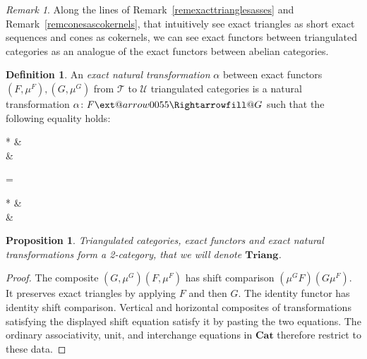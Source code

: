 \documentclass[11pt,reqno,a4paper]{amsart}
\makeatletter
\newtheorem{proposition}[theorem]{Proposition}
\theoremstyle{definition}
\newtheorem{definition}[theorem]{Definition}
\theoremstyle{remark}
\newtheorem{remark}[theorem]{Remark}
\def\nameit#1{\textrm{#1}~}
\def\remx{\nameit{Remark}}
\def\dfn#1{{\itshape #1}}
\newenvironment{eqD*}{\begin{equation*}}{\end{equation*}\ignorespacesafterend}
\newcommand{\T}{\mathcal{T}}
\newcommand{\U}{\mathcal{U}}
\newcommand{\0}{\mathbf{0}}
\renewcommand{\1}{\mathbf{1}}
\newcommand{\Cat}{\mathbf{Cat}}
\newcommand{\Triang}{\mathbf{Triang}}
\def\:{\colon}
\newcommand{\aR}[2][]{
	\ext@arrow 0055{\Rightarrowfill@}{#1}{#2}}
\makeatother
\begin{document}
\begin{remark}
    Along the lines of \remx\ref{remexacttrianglesasses} and \remx\ref{remconesascokernels}, that intuitively see exact triangles as short exact sequences and cones as cokernels, we can see exact functors between triangulated categories as an analogue of the exact functors between abelian categories.
\end{remark}

\begin{definition}
    An \dfn{exact natural transformation} $\alpha$ between exact functors $(F,\mu^F),(G,\mu^G)$ from $\T$ to $\U$ triangulated categories is a natural transformation $\alpha\:F\aR{}G$ such that the following equality holds:
    \begin{eqD*}
        \begin{cd}*
            \T \& \U \\
	\T \& \U
	\arrow[""{name=0, anchor=center, inner sep=0}, "G", bend left=45, from=1-1, to=1-2]
	\arrow[""{name=1, anchor=center, inner sep=0}, "F"',bend right=20, from=1-1, to=1-2]
	\arrow[""{name=2, anchor=center, inner sep=0}, "{\Sigma^{\T}}"', from=1-1, to=2-1]
	\arrow[""{name=3, anchor=center, inner sep=0}, "{\Sigma^{\U}}", from=1-2, to=2-2]
	\arrow["F"', from=2-1, to=2-2]
	\arrow["{\alpha}"',shorten <=0.5ex, shorten >=0.5ex, Rightarrow, from=1, to=0]
	\arrow["{\mu^F}"',shorten <=2.5ex, shorten >=2.5ex, Rightarrow, from=2, to=3]
        \end{cd} \quad = \quad
        \begin{cd}*
            \T \& \U \\
	\T \& \U
	\arrow["G", from=1-1, to=1-2]
	\arrow[""{name=0, anchor=center, inner sep=0}, "{\Sigma^{\T}}"', from=1-1, to=2-1]
	\arrow[""{name=1, anchor=center, inner sep=0}, "{\Sigma^{\U}}", from=1-2, to=2-2]
	\arrow[""{name=2, anchor=center, inner sep=0}, "F"', bend right=45, from=2-1, to=2-2]
	\arrow[""{name=3, anchor=center, inner sep=0}, "G",bend left=20, from=2-1, to=2-2]
	\arrow["{\mu^G}",shorten <=2.5ex, shorten >=2.5ex, Rightarrow, from=0, to=1]
	\arrow["\alpha"',shorten <=0.5ex, shorten >=0.5ex, Rightarrow, from=2, to=3]
        \end{cd}
    \end{eqD*}
\end{definition}

\begin{proposition}
    Triangulated categories, exact functors and exact natural transformations form a 2-category, that we will denote $\Triang$.
\end{proposition}
\begin{proof}
    The composite $(G,\mu^G)(F,\mu^F)$ has shift comparison $(\mu^G F)(G\mu^F)$. It preserves exact triangles by applying $F$ and then $G$. The identity functor has identity shift comparison. Vertical and horizontal composites of transformations satisfying the displayed shift equation satisfy it by pasting the two equations. The ordinary associativity, unit, and interchange equations in $\Cat$ therefore restrict to these data.
\end{proof}
\end{document}
